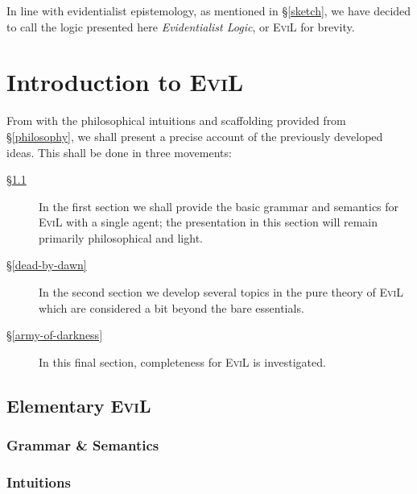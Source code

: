 \documentclass[11pt]{article}
\numberwithin{equation}{subsection}
\begin{document}
In line with evidentialist epistemology, as mentioned in
\S\ref{sketch}, we have decided to call the logic presented here
\emph{Evidentialist Logic}, or \textsc{EviL} for brevity.

\section{Introduction to \textsc{EviL}}\label{evil-semantics}
From with the philosophical intuitions and scaffolding provided from
\S\ref{philosophy}, we shall present a precise account of the previously
developed ideas.  This shall be done in three movements:
\begin{description}
 \item[\S\ref{basic-evil}]  In the first section we shall provide the
   basic grammar and semantics for \textsc{EviL} with a single agent;
   the presentation in this section will remain primarily
   philosophical and light.
 \item[\S\ref{dead-by-dawn}]  In the second section we develop several
   topics in the pure theory of \textsc{EviL} which are considered a bit
   beyond the bare essentials.
  \item[\S\ref{army-of-darkness}]  In this final section, completeness for
    \textsc{EviL} is investigated.
\end{description}


\subsection{Elementary \textsc{EviL}}\label{basic-evil}
\subsubsection{Grammar \& Semantics}\label{evil-grammar}

\subsubsection{Intuitions}\label{evil-intuition}

\end{document}
